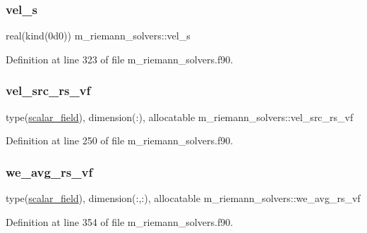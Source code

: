 \subsubsection{\texorpdfstring{vel\+\_\+s}{vel\_s}}
{\footnotesize\ttfamily real(kind(0d0)) m\+\_\+riemann\+\_\+solvers\+::vel\+\_\+s}



Definition at line 323 of file m\+\_\+riemann\+\_\+solvers.\+f90.

\mbox{\label{namespacem__riemann__solvers_aee9f1299db2c29eabb5d2ef096f0abe0}} 
\subsubsection{\texorpdfstring{vel\+\_\+src\+\_\+rs\+\_\+vf}{vel\_src\_rs\_vf}}
{\footnotesize\ttfamily type(\hyperlink{structm__derived__types_1_1scalar__field}{scalar\+\_\+field}), dimension(\+:), allocatable m\+\_\+riemann\+\_\+solvers\+::vel\+\_\+src\+\_\+rs\+\_\+vf}



Definition at line 250 of file m\+\_\+riemann\+\_\+solvers.\+f90.

\mbox{\label{namespacem__riemann__solvers_a298482aa3e595dfe2401920ad841eb8f}} 
\subsubsection{\texorpdfstring{we\+\_\+avg\+\_\+rs\+\_\+vf}{we\_avg\_rs\_vf}}
{\footnotesize\ttfamily type(\hyperlink{structm__derived__types_1_1scalar__field}{scalar\+\_\+field}), dimension(\+:,\+:), allocatable m\+\_\+riemann\+\_\+solvers\+::we\+\_\+avg\+\_\+rs\+\_\+vf}



Definition at line 354 of file m\+\_\+riemann\+\_\+solvers.\+f90.

\mbox{\label{namespacem__riemann__solvers_a953a81975cc1627c87baca12ed51ed95}} 
